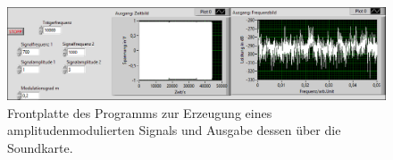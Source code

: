\documentclass[
a4paper,
12pt,
pagesize,
ngerman
]{scrartcl}
\begin{document}
	\begin{figure}[H]  
		\includegraphics[width=1\textwidth]{EIRE2018Dateien/Tag3/Soundkarteoutoszi/AMp}
		\centering
		\caption{
			Frontplatte des Programms zur Erzeugung eines amplitudenmodulierten Signals und Ausgabe dessen über die Soundkarte. %
		}
		\label{fig_tag3_am_soundkarte_front}
		\centering
	\end{figure}

	
\end{document}
